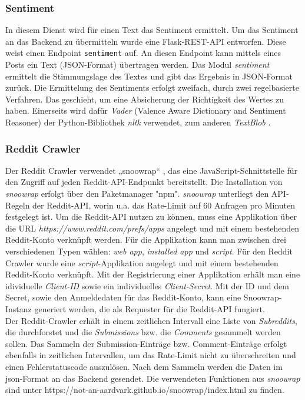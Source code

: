 \documentclass[a4paper, 10pt, conference]{IEEEtran}
\begin{document}
\subsubsection{Sentiment}

In diesem Dienst wird für einen Text das Sentiment ermittelt. Um das Sentiment an das Backend zu übermitteln wurde eine Flask-REST-API entworfen. Diese weist einen Endpoint \texttt{\/sentiment} auf. An diesen Endpoint kann mittels eines Posts ein Text (JSON-Format) übertragen werden. Das Modul \textit{sentiment} ermittelt die Stimmungslage des Textes und gibt das Ergebnis in JSON-Format zurück. Die Ermittelung des Sentiments erfolgt zweifach, durch zwei regelbasierte Verfahren.  Das geschieht, um eine Absicherung der Richtigkeit des Wertes zu haben. Einerseits wird dafür \textit{Vader} \cite{vader}(Valence Aware Dictionary and Sentiment Reasoner) der Python-Bibliothek \textit{nltk} verwendet, zum anderen \textit{TextBlob} \cite{textblob}. 

\subsubsection{Reddit Crawler}

Der Reddit Crawler verwendet „snoowrap“ \cite{snoowrap}, das eine JavaScript-Schnittstelle für den Zugriff auf jeden Reddit-API-Endpunkt bereitstellt. Die Installation von \textit{snoowrap} erfolgt über den Paketmanager "npm". \textit{snoowrap} unterliegt den API-Regeln der Reddit-API, worin u.a. das Rate-Limit auf 60 Anfragen pro Minuten festgelegt ist. Um die Reddit-API nutzen zu können, muss eine Applikation über die URL \textit{https://www.reddit.com/prefs/apps} angelegt und mit einem bestehenden Reddit-Konto verknüpft werden. Für die Applikation kann man zwischen drei verschiedenen Typen wählen: \textit{web app}, \textit{installed app} und \textit{script}. Für den Reddit Crawler wurde eine \textit{script}-Applikation angelegt und mit einem bestehenden Reddit-Konto verknüpft. Mit der Registrierung einer Applikation erhält man eine idividuelle \textit{Client-ID} sowie ein individuelles \textit{Client-Secret}. Mit der ID und dem Secret, sowie den Anmeldedaten für das Reddit-Konto, kann eine Snoowrap-Instanz generiert werden, die als Requester für die Reddit-API fungiert.\\

Der Reddit-Crawler erhält in einem zeitlichen Intervall eine Liste von \textit{Subreddits}, die durchforstet und die \textit{Submissions} bzw. die \textit{Comments} gesammelt werden sollen. Das Sammeln der Submission-Einträge bzw. Comment-Einträge erfolgt ebenfalls in zeitlichen Intervallen, um das Rate-Limit nicht zu überschreiten und einen Fehlerstatuscode auszulösen. Nach dem Sammeln werden die Daten im json-Format an das Backend gesendet. Die verwendeten Funktionen aus \textit{snoowrap} sind unter https://not-an-aardvark.github.io/snoowrap/index.html zu finden.
\end{document}
